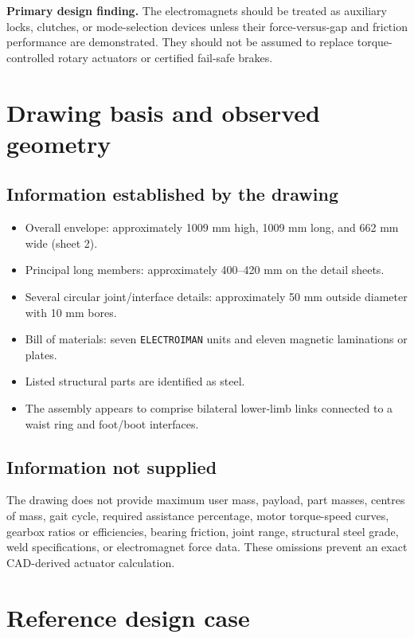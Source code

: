 \documentclass[11pt,a4paper]{article}
\newcommand{\highlightbox}[2]{%
  \begingroup
  \setlength{\fboxsep}{8pt}%
  \noindent\colorbox{#1}{\parbox{\dimexpr\linewidth-2\fboxsep\relax}{#2}}%
  \endgroup
}
\begin{document}
\highlightbox{PaleTeal}{%
  \textbf{Primary design finding.} The electromagnets should be treated as auxiliary locks, clutches, or mode-selection devices unless their force-versus-gap and friction performance are demonstrated. They should not be assumed to replace torque-controlled rotary actuators or certified fail-safe brakes.
}

\section{Drawing basis and observed geometry}

\subsection{Information established by the drawing}

\begin{itemize}
  \item Overall envelope: approximately 1009 mm high, 1009 mm long, and 662 mm wide (sheet 2).
  \item Principal long members: approximately 400--420 mm on the detail sheets.
  \item Several circular joint/interface details: approximately 50 mm outside diameter with 10 mm bores.
  \item Bill of materials: seven \texttt{ELECTROIMAN} units and eleven magnetic laminations or plates.
  \item Listed structural parts are identified as steel.
  \item The assembly appears to comprise bilateral lower-limb links connected to a waist ring and foot/boot interfaces.
\end{itemize}

\subsection{Information not supplied}

The drawing does not provide maximum user mass, payload, part masses, centres of mass, gait cycle, required assistance percentage, motor torque-speed curves, gearbox ratios or efficiencies, bearing friction, joint range, structural steel grade, weld specifications, or electromagnet force data. These omissions prevent an exact CAD-derived actuator calculation.

\section{Reference design case}
\end{document}
